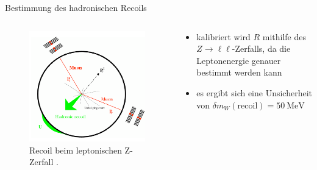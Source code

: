 \documentclass[aspectratio=1610, 9pt]{beamer}
\begin{document}
\begin{frame}{Bestimmung des hadronischen Recoils}
\end{frame}

\begin{frame}
  \begin{columns}
    \begin{column}{0.4\textwidth}
      \begin{figure}
        \includegraphics[width=\textwidth]{images/z-recoil.png}
        \caption{Recoil beim leptonischen Z-Zerfall \cite{recoil}.}
      \end{figure}
    \end{column}
    \begin{column}{0.4\textwidth}
      \begin{itemize}
        \item kalibriert wird $R$ mithilfe des $Z \rightarrow \ell \ell$-Zerfalls, da die Leptonenergie genauer bestimmt werden kann
        \item es ergibt sich eine Unsicherheit von $\delta m_W (\text{recoil}) = \SI{50}{\MeV}$
      \end{itemize}
    \end{column}
  \end{columns}
\end{frame}
\end{document}
